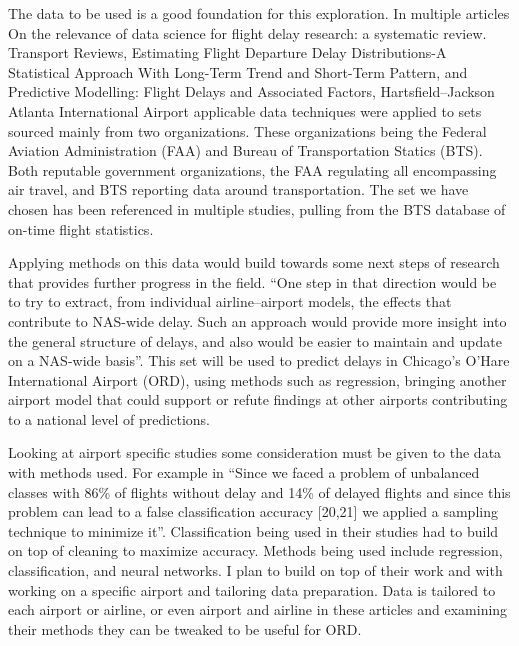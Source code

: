 \documentclass[a4paper,12pt]{article}
\begin{document}
The data to be used is a good foundation for this exploration. In multiple articles On the relevance of data science for flight delay research: a systematic review. Transport Reviews,
Estimating Flight Departure Delay Distributions-A Statistical Approach With Long-Term Trend and Short-Term Pattern, and Predictive Modelling: Flight Delays and Associated Factors,
Hartsfield–Jackson Atlanta International Airport applicable data techniques were applied to sets sourced mainly from two organizations. These organizations being the Federal Aviation Administration (FAA)
and Bureau of Transportation Statics (BTS). Both reputable government organizations, the FAA regulating all encompassing air travel, and BTS reporting data around transportation.
The set we have chosen has been referenced in multiple studies, pulling from the BTS database of on-time flight statistics. 

Applying methods on this data would build towards some next steps of research that provides further progress in the field. “One step in that direction would be to try to extract, from individual airline–airport models,
the effects that contribute to NAS-wide delay. Such an approach would provide more insight into the general structure of delays, and also would be easier to maintain and update on a NAS-wide basis”\cite{doi:10.1198/016214507000000257}. %
 This set will be used to predict delays in Chicago’s O’Hare International Airport (ORD), using methods such as regression, bringing another airport model that could support or refute findings at other airports contributing to a national level of predictions.

Looking at airport specific studies some consideration must be given to the data with methods used. For example in “Since we faced a problem of unbalanced classes with 86\% of flights without delay and 14\% of delayed flights
 and since this problem can lead to a false classification accuracy [20,21] we applied a sampling technique to minimize it”\cite{HENRIQUES2018638}. Classification being used in their studies had to build on top of cleaning to maximize accuracy. %
  Methods being used include regression, classification, and neural networks. I plan to build on top of their work and with working on a specific airport and tailoring data preparation. Data is tailored to each airport or airline,
   or even airport and airline in these articles and examining their methods they can be tweaked to be useful for ORD. 
\end{document}
